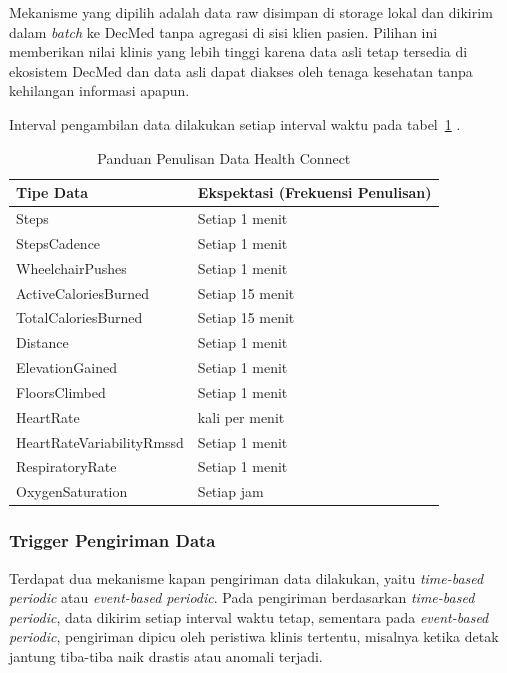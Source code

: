 Mekanisme yang dipilih adalah data raw disimpan di storage lokal dan dikirim dalam \textit{batch} ke DecMed tanpa agregasi di sisi klien pasien.
Pilihan ini memberikan nilai klinis yang lebih tinggi karena data asli tetap tersedia di ekosistem DecMed dan data asli dapat diakses oleh tenaga kesehatan tanpa kehilangan informasi apapun. %

Interval pengambilan data dilakukan setiap interval waktu pada tabel~\ref{health-connect-send-data-interval} \parencite{android_hc_write}.

\begin{table}[htbp]
	\centering
	\caption{Panduan Penulisan Data Health Connect}\label{health-connect-send-data-interval}
	\renewcommand{\arraystretch}{1.25}
	\setlength{\tabcolsep}{8pt}
	\begin{tabularx}{\textwidth}{>{\raggedright\arraybackslash}p{}>{\raggedright\arraybackslash}X}
		\rowcolor[HTML]{DDEBF7}
		\textbf{Tipe Data} & \textbf{Ekspektasi (Frekuensi Penulisan)} \\
		\midrule
		Steps & Setiap 1 menit \\
		\midrule
		StepsCadence & Setiap 1 menit \\
		\midrule
		WheelchairPushes & Setiap 1 menit \\
		\midrule
		ActiveCaloriesBurned & Setiap 15 menit \\
		\midrule
		TotalCaloriesBurned & Setiap 15 menit \\
		\midrule
		Distance & Setiap 1 menit \\
		\midrule
		ElevationGained & Setiap 1 menit \\
		\midrule
		FloorsClimbed & Setiap 1 menit \\
		\midrule
		HeartRate & 4 kali per menit \\
		\midrule
		HeartRateVariabilityRmssd & Setiap 1 menit \\
		\midrule
		RespiratoryRate & Setiap 1 menit \\
		\midrule
		OxygenSaturation & Setiap jam \\
		\bottomrule
	\end{tabularx}
\end{table}

\subsubsection{Trigger Pengiriman Data}

Terdapat dua mekanisme kapan pengiriman data dilakukan, yaitu \textit{time-based periodic} atau \textit{event-based periodic}.
Pada pengiriman berdasarkan \textit{time-based periodic}, data dikirim setiap interval waktu tetap, sementara pada \textit{event-based periodic}, pengiriman dipicu oleh peristiwa klinis tertentu, misalnya ketika detak jantung tiba-tiba naik drastis atau anomali terjadi.

